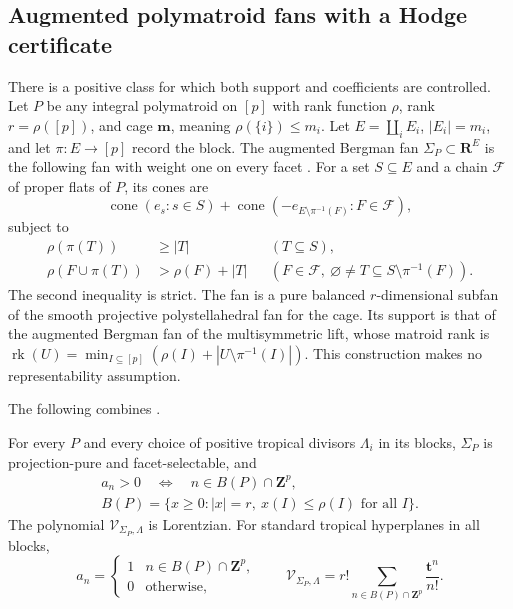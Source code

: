 \subsection{Augmented polymatroid fans with a Hodge certificate}
\label{sec:appG-augmented-polymatroid-volume}

There is a positive class for which both support and coefficients
are controlled. Let $P$ be any integral polymatroid on $[p]$
with rank function $\rho$, rank $r=\rho([p])$, and cage
$\mathbf m$, meaning $\rho(\{i\})\leq m_i$.
Let $E=\coprod_i E_i$, $|E_i|=m_i$, and let
$\pi:E\to[p]$ record the block. The augmented Bergman fan
$\Sigma_P\subset\mathbf R^E$ is the following fan with
weight one on every facet
\cite[Definition~3.7 and Theorem~3.8]{EurLarson23PolymatroidsV2}.
For a set $S\subseteq E$ and a chain $\mathcal F$ of proper
flats of $P$, its cones are
\[
 \operatorname{cone}(e_s:s\in S)
       +\operatorname{cone}(-e_{E\setminus\pi^{-1}(F)}:
                                                    F\in\mathcal F),
\tag{G.38}\label{eq:appG-augmented-polymatroid-cones}
\]
subject to
\[
 \begin{aligned}
 \rho(\pi(T))&\geq |T|&& (T\subseteq S),\\
 \rho(F\cup\pi(T))&>\rho(F)+|T|
   && (F\in\mathcal F,\ \varnothing\ne T\subseteq S\setminus\pi^{-1}(F)).
 \end{aligned}
\tag{G.39}\label{eq:appG-augmented-polymatroid-compatibility}
\]
The second inequality is strict. The fan is a pure balanced
$r$-dimensional subfan of the smooth projective polystellahedral
fan for the cage. Its support is that of the augmented
Bergman fan of the multisymmetric lift, whose matroid rank is
$\operatorname{rk}(U)=\min_{I\subseteq[p]}(\rho(I)+|U\setminus\pi^{-1}(I)|)$.
This construction makes no representability assumption.

The following combines \cite[Theorem~5.4 and Corollary~5.6]{CidRuiz26TropicalMultidegreesV2}.
\begin{theorem}
\label{thm:appG-augmented-polymatroid-volume}
For every $P$ and every choice of positive tropical divisors
$\Lambda_i$ in its blocks, $\Sigma_P$ is projection-pure and
facet-selectable, and
\[
 \begin{gathered}
 a_n>0\quad\Longleftrightarrow\quad n\in B(P)\cap\mathbf Z^p,\\
 B(P)=\{x\geq0:|x|=r,\ x(I)\leq\rho(I)\text{ for all }I\}.
 \end{gathered}
\]
The polynomial $\mathcal V_{\Sigma_P,\Lambda}$ is Lorentzian.
For standard tropical hyperplanes in all blocks,
\[
 a_n=\begin{cases}1&n\in B(P)\cap\mathbf Z^p,\\0&\text{otherwise},\end{cases}
 \qquad
 \mathcal V_{\Sigma_P,\Lambda}
      =r!\sum_{n\in B(P)\cap\mathbf Z^p}\frac{\mathbf t^n}{n!}.
\tag{G.40}\label{eq:appG-augmented-polymatroid-base-polynomial}
\]
\end{theorem}

